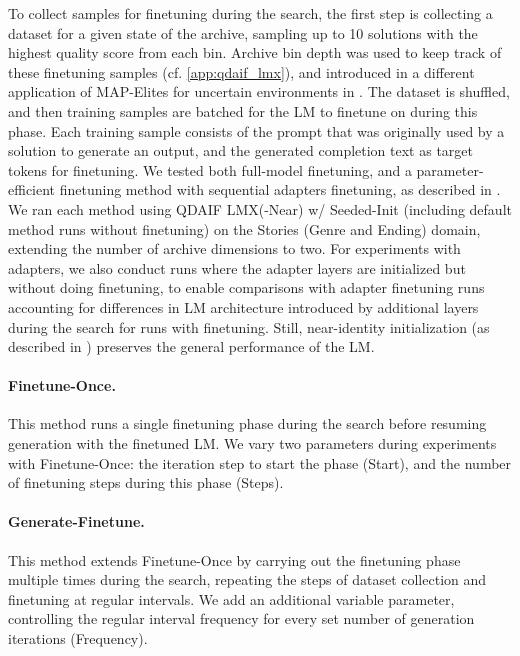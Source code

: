 To collect samples for finetuning during the search, the first step is collecting a dataset for a given state of the archive, sampling up to 10 solutions with the highest quality score from each bin. Archive bin depth was used to keep track of these finetuning samples (cf. \cref{app:qdaif_lmx}), and introduced in a different application of MAP-Elites for uncertain environments in \citet{flageat2020fast,flageat2023uncertain}. The dataset is shuffled, and then training samples are batched for the LM to finetune on during this phase. Each training sample consists of the prompt that was originally used by a solution to generate an output, and the generated completion text as target tokens for finetuning. We tested both full-model finetuning, and a parameter-efficient finetuning method with sequential adapters finetuning, as described in \citet{he2021towards}. We ran each method using QDAIF LMX(-Near) w/ Seeded-Init (including default method runs without finetuning) on the Stories (Genre and Ending) domain, extending the number of archive dimensions to two. For experiments with adapters, we also conduct runs where the adapter layers are initialized but without doing finetuning, to enable comparisons with adapter finetuning runs accounting for differences in LM architecture introduced by additional layers during the search for runs with finetuning. Still, near-identity initialization (as described in \citet{houlsby2019parameter}) preserves the general performance of the LM.

\paragraph{Finetune-Once.}
This method runs a single finetuning phase during the search before resuming generation with the finetuned LM. We vary two parameters during experiments with Finetune-Once: the iteration step to start the phase (Start), and the number of finetuning steps during this phase (Steps).

\paragraph{Generate-Finetune.}
This method extends Finetune-Once by carrying out the finetuning phase multiple times during the search, repeating the steps of dataset collection and finetuning at regular intervals. We add an additional variable parameter, controlling the regular interval frequency for every set number of generation iterations (Frequency).

